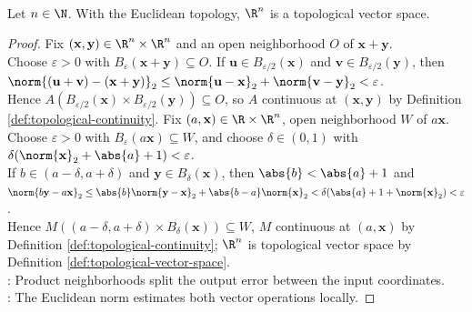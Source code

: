 \begin{proposition} \label{prop:rn-standard-topological-vector-space} \\
Let $n\in\N$. With the Euclidean topology, $\R^n$ is a topological vector space.
\begin{proof}
Fix $(\mathbf{x},\mathbf{y})\in\R^n\times\R^n$ and an open neighborhood $O$ of $\mathbf{x}+\mathbf{y}$.\\
Choose $\varepsilon>0$ with $B_{\varepsilon}(\mathbf{x}+\mathbf{y})\subseteq O$. If $\mathbf{u}\in B_{\varepsilon/2}(\mathbf{x})$ and $\mathbf{v}\in B_{\varepsilon/2}(\mathbf{y})$, then $\norm{(\mathbf{u}+\mathbf{v})-(\mathbf{x}+\mathbf{y})}_2\leq\norm{\mathbf{u}-\mathbf{x}}_2+\norm{\mathbf{v}-\mathbf{y}}_2<\varepsilon$.\\
Hence $A(B_{\varepsilon/2}(\mathbf{x})\times B_{\varepsilon/2}(\mathbf{y}))\subseteq O$, so $A$ continuous at $(\mathbf{x},\mathbf{y})$ by Definition \ref{def:topological-continuity}. Fix $(a,\mathbf{x})\in\R\times\R^n$, open neighborhood $W$ of $a\mathbf{x}$.\\
Choose $\varepsilon>0$ with $B_{\varepsilon}(a\mathbf{x})\subseteq W$, and choose $\delta\in(0,1)$ with $\delta(\norm{\mathbf{x}}_2+\abs{a}+1)<\varepsilon$.\\
If $b\in(a-\delta,a+\delta)$ and $\mathbf{y}\in B_{\delta}(\mathbf{x})$, then $\abs{b}<\abs{a}+1$ and $\norm{b\mathbf{y}-a\mathbf{x}}_2\leq\abs{b}\norm{\mathbf{y}-\mathbf{x}}_2+\abs{b-a}\norm{\mathbf{x}}_2<\delta(\abs{a}+1+\norm{\mathbf{x}}_2)<\varepsilon$.\\
Hence $M((a-\delta,a+\delta)\times B_{\delta}(\mathbf{x}))\subseteq W$, $M$ continuous at $(a,\mathbf{x})$ by Definition \ref{def:topological-continuity}; $\R^n$ is  topological vector space by Definition \ref{def:topological-vector-space}.\\
: Product neighborhoods split the output error between the input coordinates.\\
: The Euclidean norm estimates both vector operations locally.
\end{proof}
\end{proposition}

